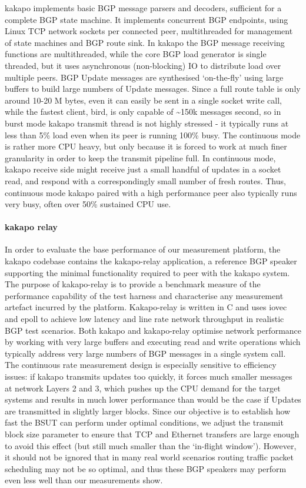 kakapo implements basic BGP message parsers and decoders, sufficient for a complete BGP state machine.
It implements concurrent BGP endpoints, using Linux TCP network sockets per connected peer, multithreaded for management of state machines and BGP route sink.
In kakapo the BGP message receiving functions are multithreaded, while the core BGP load generator is single threaded,  but it uses asynchronous (non-blocking) IO to distribute load over multiple peers.
BGP Update messages are synthesised `on-the-fly' using large buffers to build large numbers of Update messages.
Since a full route table is only around 10-20 M bytes, even it can easily be sent in a single socket write call, while the fastest client, bird, is only capable of \textasciitilde150k messages second, so in burst mode kakapo transmit thread is not highly stressed - it typically runs at less than 5\% load even when its peer is running 100\% busy.
The continuous mode is rather more CPU heavy, but only because it is forced to work at much finer granularity in order to keep the transmit pipeline full.
In continuous mode, kakapo receive side might receive just a small handful of updates in a socket read, and respond with a correspondingly small number of fresh routes.
Thus, continuous mode kakapo paired with a high performance peer also typically runs very busy, often over 50\% sustained CPU use.

\paragraph{\textbf{kakapo relay}}
In order to evaluate the base performance of our measurement platform, the kakapo codebase contains the kakapo-relay application, a reference BGP speaker supporting the minimal functionality required to peer with the kakapo system.
The purpose of kakapo-relay is to provide a benchmark measure of the performance capability of the test harness and characterise any measurement artefact incurred by the platform.
Kakapo-relay is written in C and uses iovec and epoll to achieve low latency and line rate network throughput in realistic BGP test scenarios.
Both kakapo and kakapo-relay optimise network performance by working with very large buffers and executing read and write operations which typically address very large numbers of BGP messages in a single system call.
The continuous rate measurement design is especially sensitive to efficiency issues: if kakapo transmits updates too quickly, it forces much smaller messages at network Layers 2 and 3, which pushes up the CPU demand for the target systems and results in much lower performance than would be the case if Updates are transmitted in slightly larger blocks.
Since our objective is to establish how fast the BSUT can perform under optimal conditions, we adjust the transmit block size parameter to ensure that TCP and Ethernet transfers are large enough to avoid this effect (but still much smaller than the `in-flight window').
However, it should not be ignored that in many real world scenarios routing traffic packet scheduling may not be so optimal, and thus these BGP speakers may perform even less well than our measurements show.

